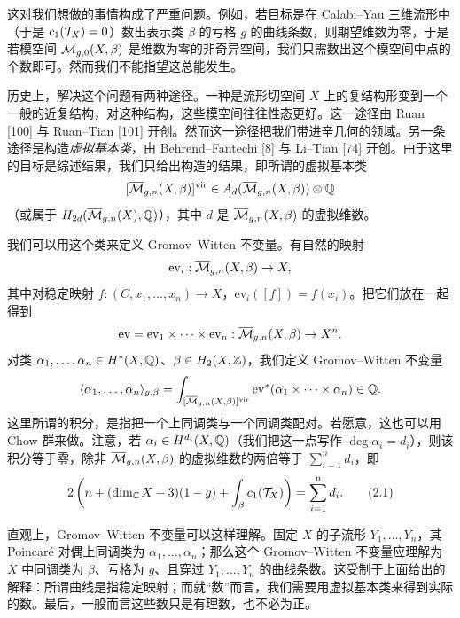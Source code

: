 这对我们想做的事情构成了严重问题。例如，若目标是在 Calabi–Yau 三维流形中（于是 $c_1(\mathcal{T}_X)=0$）数出表示类 $\beta$ 的亏格 $g$ 的曲线条数，则期望维数为零，于是若模空间 $\overline{\mathcal{M}}_{g,0}(X,\beta)$ 是维数为零的非奇异空间，我们只需数出这个模空间中点的个数即可。然而我们不能指望这总能发生。

历史上，解决这个问题有两种途径。一种是流形切空间 $X$ 上的复结构形变到一个一般的近复结构，对这种结构，这些模空间往往性态更好。这一途径由 Ruan [100] 与 Ruan–Tian [101] 开创。然而这一途径把我们带进辛几何的领域。另一条途径是构造\emph{虚拟基本类}，由 Behrend–Fantechi [8] 与 Li–Tian [74] 开创。由于这里的目标是综述结果，我们只给出构造的结果，即所谓的虚拟基本类
\[
[\overline{\mathcal{M}}_{g,n}(X,\beta)]^{\mathrm{vir}}\in A_d(\overline{\mathcal{M}}_{g,n}(X,\beta))\otimes\mathbb{Q}
\]
（或属于 $H_{2d}(\overline{\mathcal{M}}_{g,n}(X),\mathbb{Q})$），其中 $d$ 是 $\overline{\mathcal{M}}_{g,n}(X,\beta)$ 的虚拟维数。

我们可以用这个类来定义 Gromov–Witten 不变量。有自然的映射
\[
\mathrm{ev}_i:\overline{\mathcal{M}}_{g,n}(X,\beta)\to X,
\]
其中对稳定映射 $f:(C,x_1,\dots,x_n)\to X$，$\mathrm{ev}_i([f])=f(x_i)$。把它们放在一起得到
\[
\mathrm{ev}=\mathrm{ev}_1\times\cdots\times\mathrm{ev}_n:\overline{\mathcal{M}}_{g,n}(X,\beta)\to X^n.
\]
对类 $\alpha_1,\dots,\alpha_n\in H^{*}(X,\mathbb{Q})$、$\beta\in H_2(X,\mathbb{Z})$，我们定义 Gromov–Witten 不变量
\[
\langle\alpha_1,\dots,\alpha_n\rangle_{g,\beta}=\int_{[\overline{\mathcal{M}}_{g,n}(X,\beta)]^{\mathrm{vir}}}\mathrm{ev}^{*}(\alpha_1\times\cdots\times\alpha_n)\in\mathbb{Q}.
\]
这里所谓的积分，是指把一个上同调类与一个同调类配对。若愿意，这也可以用 Chow 群来做。注意，若
$\alpha_i\in H^{d_i}(X,\mathbb{Q})$（我们把这一点写作 $\deg\alpha_i=d_i$），则该积分等于零，除非 $\overline{\mathcal{M}}_{g,n}(X,\beta)$ 的虚拟维数的两倍等于 $\sum_{i=1}^{n}d_i$，即
\begin{equation}
2\left(n+(\dim_{\mathbb{C}}X-3)(1-g)+\int_{\beta}c_1(\mathcal{T}_X)\right)=\sum_{i=1}^{n}d_i. \tag{2.1}
\end{equation}


直观上，Gromov–Witten 不变量可以这样理解。固定 $X$ 的子流形 $Y_1,\dots,Y_n$，其 Poincaré 对偶上同调类为 $\alpha_1,\dots,\alpha_n$；那么这个 Gromov–Witten 不变量应理解为 $X$ 中同调类为 $\beta$、亏格为 $g$、且穿过 $Y_1,\dots,Y_n$ 的曲线条数。这受制于上面给出的解释：所谓曲线是指稳定映射；而就“数”而言，我们需要用虚拟基本类来得到实际的数。最后，一般而言这些数只是有理数，也不必为正。

